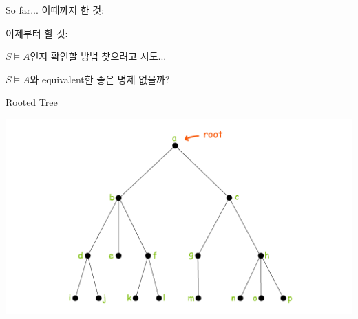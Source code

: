 \documentclass[../231120_msquare_computational-logic.tex]{subfiles}
\begin{document}
\begin{frame}{So far...}
    이때까지 한 것:
    \begin{center}
    \end{center}
    \pause
    \begin{alertblock}{}
        이제부터 할 것:
        \begin{itemize}
            \ii \(S \vDash A\)인지 확인할 방법 찾으려고 시도...
                \begin{itemize}
                    \ii \(S \vDash A\)와 equivalent한 좋은 명제 없을까?
                \end{itemize}
        \end{itemize}
    \end{alertblock}
\end{frame}

\begin{frame}{Rooted Tree}
    \begin{center}
        \includegraphics[width=1\textwidth]{./rooted_tree_graph.png}
    \end{center}
\end{frame}
\end{document}
